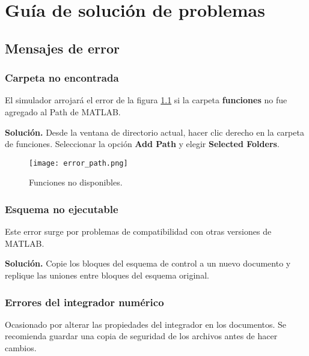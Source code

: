\chapter{Guía de solución de problemas}
\label{chapter: troubleshooting}

\section{Mensajes de error}

\subsection{Carpeta no encontrada}
El simulador arrojará el error de la figura 
\ref{fig: path error} si la carpeta \textbf{funciones}
no fue agregado al Path de MATLAB.

\textbf{Solución.} Desde la ventana de directorio actual, 
hacer clic derecho en la carpeta de funciones.
Seleccionar la opción \textbf{Add Path} y elegir \textbf{Selected Folders}.

\begin{figure}[htb!]
 \centering
 \texttt{[image: error\_path.png]}
 \caption{Funciones no disponibles.}
 \label{fig: path error}
\end{figure}

\subsection{Esquema no ejecutable}
Este error surge por problemas de compatibilidad con otras versiones de MATLAB.

\textbf{Solución.}
Copie los bloques del esquema de control a un nuevo documento y 
replique las uniones entre bloques del esquema original.

\subsection{Errores del integrador numérico}
Ocasionado por alterar las propiedades del integrador en
los documentos. 
Se recomienda guardar una copia de seguridad 
de los archivos antes de hacer cambios.

